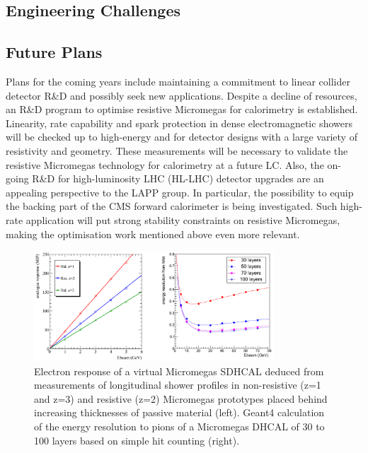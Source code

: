 \subsection{Engineering Challenges}

\subsection{Future Plans}
Plans for the coming years include maintaining a commitment to linear collider detector R\&D and possibly seek new applications. Despite a decline of resources, an R\&D program to optimise resistive Micromegas for calorimetry is established. Linearity, rate capability and spark protection in dense electromagnetic showers will be checked up to high-energy and for detector designs with a large variety of resistivity and geometry. These measurements will be necessary to validate the resistive Micromegas technology for calorimetry at a future LC. Also, the on-going R\&D for high-luminosity LHC (HL-LHC) detector upgrades are an appealing perspective to the LAPP group. In particular, the possibility to equip the backing part of the CMS forward calorimeter is being investigated. Such high-rate application will put strong stability constraints on resistive Micromegas, making the optimisation work mentioned above even more relevant.

\begin{figure}
\begin{centering}
\includegraphics[width=0.8\textwidth]{Calorimeter/SDHCAL/test2}
\caption{Electron response of a virtual Micromegas SDHCAL deduced from measurements of longitudinal shower profiles in non-resistive (z=1 and z=3) and resistive (z=2) Micromegas prototypes placed behind increasing thicknesses of passive material (left). Geant4 calculation of the energy resolution to pions of a Micromegas DHCAL of 30 to 100 layers based on simple hit counting (right).}
\label{future}
\end{centering}
\end{figure}

